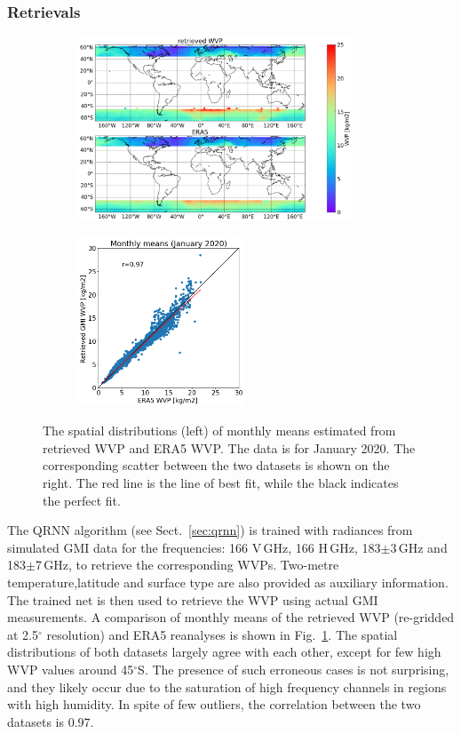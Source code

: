 \documentclass[12pt,oneside,a4paper]{article}
\begin{document}
\subsubsection{Retrievals}
\label{sec:preliminary_results}
\begin{figure}[t]
	\centering
	\begin{subfigure}{.54\textwidth}
		\includegraphics[height = 55mm]{Figures/WVP_spatial_jan2020.png}
	\end{subfigure}
	\begin{subfigure}{.34\textwidth}
	\includegraphics[height = 50mm]{Figures/WVP_scatter_monthlymean.png} 
	\end{subfigure}
	\caption{The spatial distributions (left) of monthly means estimated from retrieved WVP and ERA5 WVP. The data is for January 2020. The corresponding scatter between the two datasets is shown on the right. The red line is the line of best fit, while the black indicates the perfect fit.}
	\label{fig:WVP_retrievals}
\end{figure}

The QRNN algorithm (see Sect.~\ref{sec:qrnn}) is trained with radiances from simulated GMI data for the frequencies: 166 V\,GHz, 166 H\,GHz, 183$\pm$3\,GHz and 183$\pm$7\,GHz, to retrieve the corresponding WVPs. Two-metre temperature,latitude and surface type are also provided as auxiliary information. The trained net is then used to retrieve the WVP using actual GMI measurements. A comparison of monthly means of the  retrieved WVP (re-gridded at 2.5$^{\circ}$ resolution) and ERA5 reanalyses is shown in Fig.~\ref{fig:WVP_retrievals}. The spatial distributions of both datasets largely agree with each other, except for few high WVP values around 45$^{\circ}$S. The presence of such erroneous cases is not surprising, and they likely occur due to the saturation of high frequency channels in regions with high humidity. In spite of few outliers, the correlation between the two datasets is 0.97.
\end{document}
